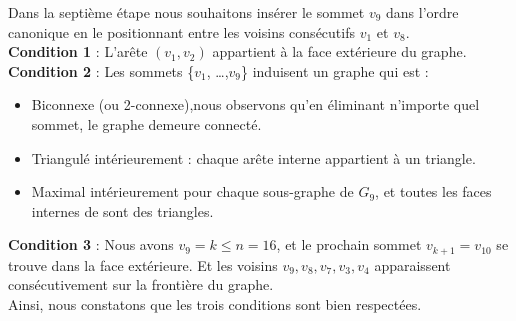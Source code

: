 \documentclass[hidelinks,letterpaper,12pt]{article}
\begin{document}
Dans la septième étape nous souhaitons insérer le sommet $v_9$ dans l'ordre canonique en le positionnant entre les voisins consécutifs $v_1$ et $v_8$.
\\
\textbf{Condition 1} : L'arête \( (v_1,v_2) \) appartient à la face extérieure du graphe.
\\
\textbf{Condition 2} : Les sommets \{$v_1$, \ldots ,$v_9$\} induisent un graphe qui est :
\begin{itemize}
\item Biconnexe (ou 2-connexe),nous observons qu'en éliminant n'importe quel sommet, le graphe demeure connecté.
\item Triangulé intérieurement : chaque arête interne appartient à un triangle.
\item Maximal intérieurement pour chaque sous-graphe de $G_9$, et toutes les faces internes de sont des triangles.
\end{itemize}
\textbf{Condition 3} : Nous avons $v_9=k \leq n=16$, et le prochain sommet $v_{k+1}=v_{10}$ se trouve dans la face extérieure. Et les voisins \(v_9, v_8, v_7, v_3, v_4\) apparaissent consécutivement sur la frontière du graphe.
\\
Ainsi, nous constatons que les trois conditions sont bien respectées.
\end{document}
